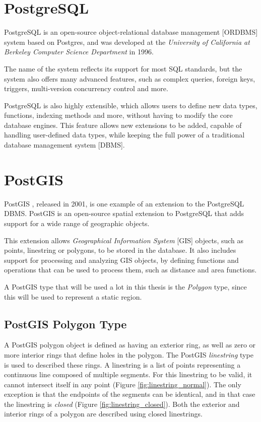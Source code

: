 
\section{PostgreSQL}
\label{section:postgresql}

PostgreSQL \cite{postgresql} is an open-source object-relational database management [ORDBMS] system based on Postgres, and was developed at the \textit{University of California at  Berkeley Computer Science Department} in 1996.

The name of the system reflects its support for most SQL standards, but the system also offers many advanced features, such as complex queries, foreign keys, triggers, multi-version concurrency control and more. 

PostgreSQL is also highly extensible, which allows users to define new data types, functions, indexing methods and more, without having to modify the core database engines. This feature allows new extensions to be added, capable of handling user-defined data types, while keeping the full power of a traditional database management system [DBMS].

\section{PostGIS}
\label{section:postgis}

PostGIS \cite{postgis}, released in 2001, is one example of an extension to the PostgreSQL DBMS. PostGIS is an open-source spatial extension to PostgreSQL that adds support for a wide range of geographic objects. 

This extension allows \textit{Geographical Information System} [GIS] objects, such as points, linestring or polygons, to be stored in the database. It also includes support for processing and analyzing GIS objects, by defining functions and operations that can be used to process them, such as distance and area functions.

A PostGIS type that will be used a lot in this thesis is the \textit{Polygon} type, since this will be used to represent a static region. 

\subsection{PostGIS Polygon Type}
\label{section:postgis_polygon}

A PostGIS polygon object is defined as having an exterior ring, as well as zero or more interior rings that define holes in the polygon. The PostGIS \textit{linestring} type is used to described these rings. A linestring
is a list of points representing a continuous line composed of multiple segments. For this linestring to be valid, it cannot intersect itself in any point (Figure \ref{fig:linestring_normal}). The only exception is that the endpoints of the segments can be identical, and in that case the linestring is \textit{closed} (Figure \ref{fig:linestring_closed}). Both the exterior and interior rings of a polygon are described using closed linestrings.

